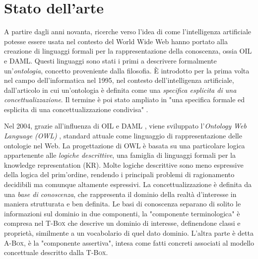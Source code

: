 \chapter[Stato dell'arte]{Stato dell'arte}
\label{chap:State-of-art}
A partire dagli anni novanta, ricerche verso l'idea di come l'intelligenza artificiale potesse essere usata nel contesto del World Wide Web hanno portato alla creazione di linguaggi formali per la rappresentazione della conoscenza, ossia OIL e DAML. Questi linguaggi sono stati i primi a descrivere formalmente un'\textit{ontologia}, concetto proveniente dalla filosofia. È introdotto per la prima volta nel campo dell'informatica nel 1995, nel contesto dell'intelligenza artificiale, dall'articolo \cite{gruber1995} in cui un'ontologia è definita come una \textit{specifica esplicita di una concettualizzazione}. Il termine è poi stato ampliato in "una specifica formale ed esplicita di una concettualizzazione condivisa" \cite{goy2015ontologies}. 

Nel 2004, grazie all'influenza di OIL \cite{Horrocks2000TheOI} e DAML \cite{hendler2000darpa}, viene sviluppato l'\textit{Ontology Web Language (OWL)} \cite{OWL}, standard attuale come linguaggio di rappresentazione delle ontologie nel Web. La progettazione di OWL è basata su una particolare logica appartenente alle \textit{logiche descrittive}, una famiglia di linguaggi formali per la knowledge representation (KR). Molte logiche descrittive sono meno espressive della logica del prim'ordine, rendendo i principali problemi di ragionamento decidibili ma comunque altamente espressivi. La concettualizzazione è definita da una \textit{base di conoscenza}, che rappresenta il dominio della realtà d'interesse in maniera strutturata e ben definita. Le basi di conoscenza separano di solito le informazioni sul dominio in due componenti, la "componente terminologica" è compresa nel \textsc{T-Box} che descrive un dominio di interesse, definendone classi e proprietà, similmente a un vocabolario di quel dato dominio. L'altra parte è detta \textsc{A-Box}, è la "componente assertiva", intesa come fatti concreti associati al modello concettuale descritto dalla \textsc{T-Box}.

